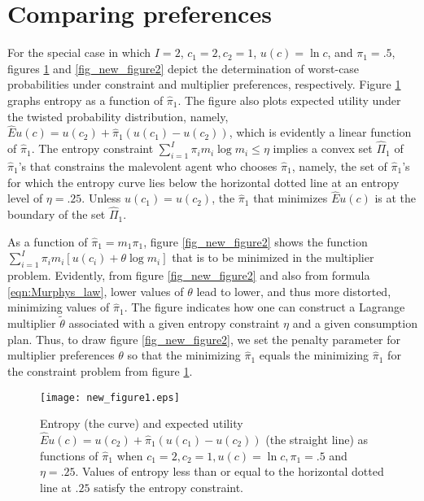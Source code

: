 \section{Comparing  preferences} %

 For the special case in which $I=2$, $c_1=2, c_2=1$, $u(c) = \ln c$,  and  $\pi_1 =.5$, figures \ref{fig_new_figure1} and \ref{fig_new_figure2} depict   the determination of worst-case probabilities under constraint and multiplier preferences, respectively.
Figure \ref{fig_new_figure1} graphs  entropy as a function of $\hat \pi_1$. The figure also plots expected utility under the twisted probability distribution, namely, $\hat E u(c) = u(c_2) + \hat \pi_1 (u(c_1) - u(c_2)) $, which is evidently  a linear function of $\hat \pi_1$.  The entropy constraint $\sum_{i=1}^I \pi_i m_i \log m_i \leq \eta$
implies a convex set $\hat \Pi_1$ of $\hat \pi_1$'s that constrains the malevolent agent who chooses $\hat \pi_1$, namely, the set of  $\hat \pi_1$'s for which
 the entropy curve lies below the horizontal dotted line at an entropy level of $\eta = .25$.  Unless $u(c_1) = u(c_2)$, the $\hat \pi_1$ that minimizes
$ \hat E u(c)$ is at the boundary of the set $\hat \Pi_1$.

 As a function of $\hat \pi_1 = m_1 \pi_1$, figure \ref{fig_new_figure2} shows the function  $ \sum_{i=1}^I \pi_i m_i [  u(c_i) + \theta \log m_i ]$ that is to be minimized in the multiplier problem.  Evidently, from figure \ref{fig_new_figure2} and also from formula \eqref{eqn:Murphys_law}, lower values of $\theta$ lead to lower, and thus more distorted,  minimizing values of $\hat \pi_1$.
The figure  indicates how one can construct a Lagrange  multiplier $\tilde \theta$  associated with a given entropy constraint $\eta$  and a given  consumption plan.  Thus, to draw figure \ref{fig_new_figure2},
 we   set the penalty parameter for  multiplier preferences   $\theta$ so
that the minimizing $\hat \pi_1$  equals the minimizing $\hat \pi_1$ for the constraint problem from figure \ref{fig_new_figure1}.


\begin{figure}[htp]
\centering
\texttt{[image: new\_figure1.eps]}
\caption[Entropy and expected utility]{Entropy (the curve) and expected utility $\hat E u(c) = u(c_2) + \hat \pi_1 (u(c_1) - u(c_2)) $ (the straight line) as functions of  $\hat \pi_1$ when $c_1 =2, c_2=1, u(c) = \ln c, \pi_1 = .5$ and $\eta=.25$. Values of entropy less than or equal to the horizontal dotted line at $.25$ satisfy the entropy constraint.}\label{fig_new_figure1}
\end{figure}


